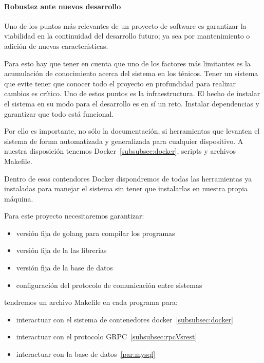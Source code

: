 \paragraph{Robustez ante nuevos desarrollo}

Uno de los puntos más relevantes de un proyecto de software es garantizar la viabilidad en la continuidad del desarrollo futuro; ya sea por mantenimiento o adición de nuevas características.

Para esto hay que tener en cuenta que uno de los factores más limitantes es la acumulación de conocimiento acerca del sistema en los ténicos. Tener un sistema que evite tener que conocer todo el proyecto en profundidad para realizar cambios es crítico. Uno de estos puntos es la infraestructura. El hecho de instalar el sistema en su modo para el desarrollo es en sí un reto. Instalar dependencias y garantizar que todo está funcional.

Por ello es importante, no sólo la documentación, si herramientas que levanten el sistema de forma automatizada y generalizada para cualquier dispositivo. A nuestra disposición tenemos Docker~\ref{subsubsec:docker}, scripts y archivos Makefile.

Dentro de esos contendores Docker dispondremos de todas las herramientas ya instaladas para manejar el sistema sin tener que instalarlas en nuestra propia máquina.

Para este proyecto necesitaremos garantizar:

\begin{itemize}
    \item versión fija de golang para compilar los programas
    \item versión fija de la las librerias
    \item versión fija de la base de datos
    \item configuración del protocolo de comunicación entre sistemas
\end{itemize}

tendremos un archivo Makefile en cada programa para:

\begin{itemize}
    \item interactuar con el sistema de contenedores docker~\ref{subsubsec:docker}
    \item interactuar con el protocolo GRPC~\ref{subsubsec:rpcVsrest}
    \item interactuar con la base de datos~\ref{par:mysql}
\end{itemize}



